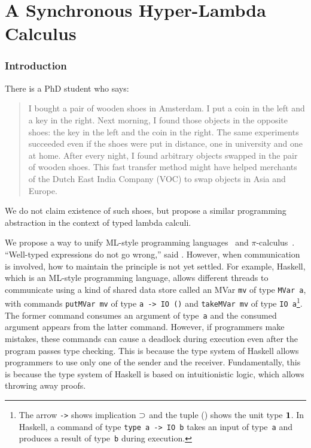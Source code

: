 \chapter{A Synchronous Hyper-Lambda Calculus}
\label{ch:exchange}

\subsection{Introduction}

There is a PhD student who says:
\begin{quotation}
 I bought a pair of wooden shoes in Amsterdam.  I put
 a coin in the left and a key in the right.
 Next morning, I found those objects in the opposite shoes:
 the key in the left and the coin in the right.
 The same experiments succeeded even if the shoes were put in distance, one in
 university and one at home.  After every night, I found arbitrary objects swapped in
 the pair of wooden shoes.
 This fast transfer method might have helped merchants of
 the Dutch East India Company (VOC) to swap objects in Asia and Europe.
\end{quotation}
We do not claim existence of such shoes, but propose
a similar programming abstraction in the context of typed lambda calculi.

We propose a way to unify ML-style programming
languages~\citep{milner1997definition, marlow2010haskell} and
$\pi$-calculus~\citep{milner1999communicating}.
``Well-typed expressions do not go wrong,'' said \citet{milner1978}.
However, when communication is involved, how to maintain the principle
is not yet settled.
For example, Haskell, which is an ML-style programming language,
allows different threads to communicate using a kind of shared data
store called an MVar \texttt{mv} of
type \texttt{MVar
a}, with commands
\texttt{putMVar mv} of type \texttt{a -> IO ()} and \texttt{takeMVar mv}
of type \texttt{IO
a}\footnote{The arrow \texttt{->} shows implication $\supset$ and the tuple
() shows the unit type $\mathbf{1}$.  In Haskell, a command of type
\texttt{type a -> IO b} takes an input of type~\texttt{a} and produces a
result of type~\texttt{b} during execution.}.
The former command consumes an argument of type~\texttt{a} and
the consumed argument appears from the latter command.
However, if programmers make mistakes, these commands can
cause a deadlock during execution even after the program passes type
checking.
This is because the type system of Haskell allows programmers to
use only one of the sender and the receiver.
Fundamentally, this is because the type system of Haskell
is based on intuitionistic logic, which allows throwing away proofs.

